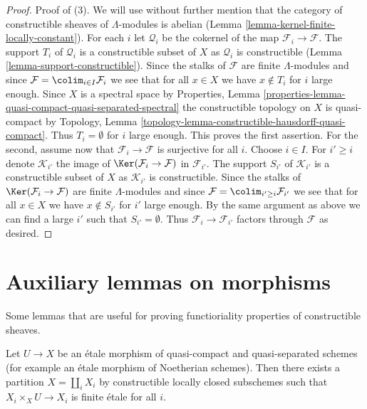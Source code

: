 \begin{proof}
\medskip\noindent
Proof of (3). We will use without further mention that the category of
constructible sheaves of $\Lambda$-modules is abelian
(Lemma \ref{lemma-kernel-finite-locally-constant}).
For each $i$ let $\mathcal{Q}_i$ be the cokernel of the map
$\mathcal{F}_i \to \mathcal{F}$. The support $T_i$ of $\mathcal{Q}_i$
is a constructible subset of $X$ as $\mathcal{Q}_i$ is constructible
(Lemma \ref{lemma-support-constructible}).
Since the stalks of $\mathcal{F}$ are finite $\Lambda$-modules
and since $\mathcal{F} = \colim_{i \in I} \mathcal{F}_i$ we see
that for all $x \in X$ we have $x \not \in T_i$ for $i$ large enough.
Since $X$ is a spectral space by Properties, Lemma
\ref{properties-lemma-quasi-compact-quasi-separated-spectral}
the constructible topology on $X$ is quasi-compact by
Topology, Lemma \ref{topology-lemma-constructible-hausdorff-quasi-compact}.
Thus $T_i = \emptyset$ for $i$ large enough. This proves the first
assertion. For the second, assume now that
$\mathcal{F}_i \to \mathcal{F}$ is surjective for all $i$.
Choose $i \in I$. For $i' \geq i$ denote $\mathcal{K}_{i'}$ the
image of $\Ker(\mathcal{F}_i \to \mathcal{F})$ in $\mathcal{F}_{i'}$.
The support $S_{i'}$ of $\mathcal{K}_{i'}$
is a constructible subset of $X$ as $\mathcal{K}_{i'}$ is constructible.
Since the stalks of $\Ker(\mathcal{F}_i \to \mathcal{F})$
are finite $\Lambda$-modules and since
$\mathcal{F} = \colim_{i' \geq i} \mathcal{F}_{i'}$ we see
that for all $x \in X$ we have $x \not \in S_{i'}$ for $i'$ large enough.
By the same argument as above we can find a large $i'$ such
that $S_{i'} = \emptyset$. Thus $\mathcal{F}_i \to \mathcal{F}_{i'}$
factors through $\mathcal{F}$ as desired.
\end{proof}




\section{Auxiliary lemmas on morphisms}
\label{section-stratify-morphisms}

\noindent
Some lemmas that are useful for proving functioriality properties
of constructible sheaves.

\begin{lemma}
\label{lemma-etale-stratified-finite}
Let $U \to X$ be an \'etale morphism of quasi-compact and quasi-separated
schemes (for example an \'etale morphism of Noetherian schemes). Then there
exists a partition $X = \coprod_i X_i$ by constructible locally closed
subschemes such that $X_i \times_X U \to X_i$ is finite \'etale for all $i$.
\end{lemma}

